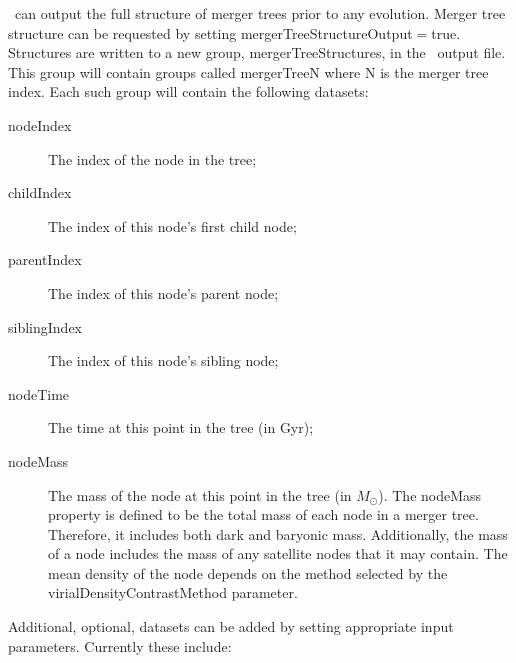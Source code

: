 \glc\ can output the full structure of merger trees prior to any evolution. Merger tree structure can be requested by setting {\normalfont \ttfamily mergerTreeStructureOutput}$=${\normalfont \ttfamily true}. Structures are written to a new group, {\normalfont \ttfamily mergerTreeStructures}, in the \glc\ output file. This group will contain groups called {\normalfont \ttfamily mergerTreeN} where {\normalfont \ttfamily N} is the merger tree index. Each such group will contain the following datasets:
\begin{description}
 \item [{\normalfont \ttfamily nodeIndex}] The index of the node in the tree;
 \item [{\normalfont \ttfamily childIndex}] The index of this node's first child node;
 \item [{\normalfont \ttfamily parentIndex}] The index of this node's parent node;
 \item [{\normalfont \ttfamily siblingIndex}] The index of this node's sibling node;
 \item [{\normalfont \ttfamily nodeTime}] The time at this point in the tree (in Gyr);
 \item [{\normalfont \ttfamily nodeMass}] The mass of the node at this point in the tree (in $M_\odot$). The {\normalfont \ttfamily nodeMass} property is defined to be the total mass of each node in a merger tree. Therefore, it includes both dark and baryonic mass. Additionally, the mass of a node includes the mass of any satellite nodes that it may contain. The mean density of the node depends on the method selected by the {\normalfont \ttfamily virialDensityContrastMethod} parameter.
\end{description}
Additional, optional, datasets can be added by setting appropriate input parameters. Currently these include:
